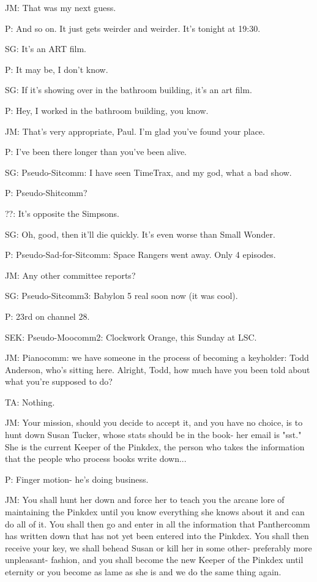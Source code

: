 \documentclass[12pt]{article}
\begin{document}
JM: That was my next guess.

P: And so on. It just gets weirder and weirder. It's tonight at 19:30.

SG: It's an ART film.

P: It may be, I don't know.

SG: If it's showing over in the bathroom building, it's an art film.

P: Hey, I worked in the bathroom building, you know.

JM: That's very appropriate, Paul. I'm glad you've found your place.

P: I've been there longer than you've been alive.

SG: Pseudo-Sitcomm: I have seen TimeTrax, and my god, what a bad show.

P: Pseudo-Shitcomm?

??: It's opposite the Simpsons.

SG: Oh, good, then it'll die quickly. It's even worse than Small Wonder.

P: Pseudo-Sad-for-Sitcomm: Space Rangers went away. Only 4 episodes.

JM: Any other committee reports?

SG: Pseudo-Sitcomm3: Babylon 5 real soon now (it was cool).

P: 23rd on channel 28.

SEK: Pseudo-Moocomm2: Clockwork Orange, this Sunday at LSC.

JM: Pianocomm: we have someone in the process of becoming a keyholder: Todd Anderson, who's sitting here. Alright, Todd, how much have you been told about what you're supposed to do?

TA: Nothing.

JM: Your mission, should you decide to accept it, and you have no choice, is to hunt down Susan Tucker, whose stats should be in the book- her email is "sst." She is the current Keeper of the Pinkdex, the person who takes the information that the people who process books write down...

P: Finger motion- he's doing business.

JM: You shall hunt her down and force her to teach you the arcane lore of maintaining the Pinkdex until you know everything she knows about it and can do all of it. You shall then go and enter in all the information that Panthercomm has written down that has not yet been entered into the Pinkdex. You shall then receive your key, we shall behead Susan or kill her in some other- preferably more unpleasant- fashion, and you shall become the new Keeper of the Pinkdex until eternity or you become as lame as she is and we do the same thing again.
\end{document}
